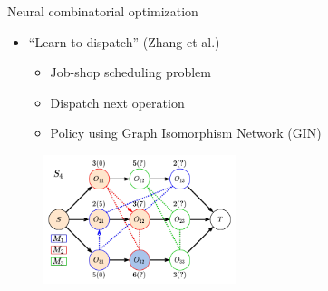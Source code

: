 \documentclass[bigger]{beamer}
\begin{document}
\begin{frame}[label={sec:org121cd3a}]{Neural combinatorial optimization}
\begin{itemize}
\item ``Learn to dispatch'' (Zhang et al.)
\begin{itemize}
\item Job-shop scheduling problem
\item Dispatch next operation
\item Policy using Graph Isomorphism Network (GIN)
\end{itemize}
\end{itemize}

\begin{figure}
  \centering
  \includegraphics[width=0.5\textwidth]{../figures/Zhang-disjunctive-graph-s4.png}
\end{figure}
\end{frame}
\end{document}
